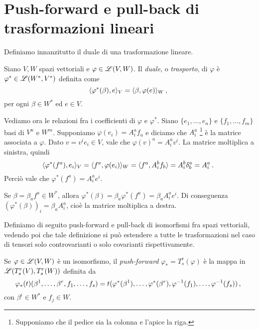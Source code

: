 \section{Push-forward e pull-back di trasformazioni lineari}

Definiamo innanzitutto il duale di una trasformazione lineare.
\begin{definition}   
	Siano $V,W$ spazi vettoriali e $\varphi \in \mathscr L(V,W)$. Il \emph{duale}, o \emph{trasporto}, di $\varphi$ è $\varphi^* \in \mathscr L(W^*,V^*)$ definita come 
	\begin{equation*}
		\Scal{\varphi^*(\beta)}{e}_V = \Scal{\beta}{\varphi(e)}_W \virgola %
	\end{equation*}
	per ogni $\beta \in W^*$ ed $e\in V$.
\end{definition}

Vediamo ora le relazioni fra i coefficienti di $\varphi$ e $\varphi^*$.
Siano $\{e_1,\ldots, e_n\}$ e $\{f_1,\ldots, f_m\}$ basi di $V^n$ e $W^m$. Supponiamo $\varphi(e_i) = A_i^af_a$ e diciamo che $A_i^a$ \footnote{Supponiamo che il pedice sia la colonna e l'apice la riga.} è la matrice associata a $\varphi$.
Dato $v = v^ie_i\in V$, vale che $\varphi(v)^a = A_i^a v^i$.
La matrice moltiplica a sinistra, quindi
\begin{equation*}
	\langle \varphi^*(f^a) , e_i \rangle_V = \langle f^a , \varphi(e_i) \rangle_W = \langle f^a , A_i^b f_b \rangle = A_i^b\delta_b^a = A_i^a\, \text{. }
\end{equation*}
Perciò vale che $\varphi^*(f^a) = A_i^a e^i$.

Se $\beta = \beta_a f^a \in W^*$, allora $\varphi^*(\beta) = \beta_a \varphi^*(f^a) = \beta_aA_i^ae^i$.
Di conseguenza $(\varphi^*(\beta))_i = \beta_aA_i^a$, cioè la matrice moltiplica a destra.


Definiamo di seguito push-forward e pull-back di isomorfismi fra spazi vettoriali, vedendo poi che tale definizione si può estendere a tutte le trasformazioni nel caso di tensori solo controvarianti o solo covarianti rispettivamente.

\begin{definition} 
	Se $\varphi \in \mathscr L(V,W)$ è un isomorfismo, il \emph{push-forward} $\varphi_* = T_s^r(\varphi)$ è la mappa in $\mathscr L(T_s^r(V), T_s^r(W))$ definita da
	\begin{equation*}
		\varphi_*(t) (\beta^1,\ldots,\beta^r,f_1,\ldots,f_s) = t(\varphi^*(\beta^1),\ldots,\varphi^*(\beta^r), \varphi^{-1}(f_1),\ldots, \varphi^{-1}(f_s)) \, \text{, }
	\end{equation*}
	con $\beta^i\in W^*$ e $f_j\in W$.
\end{definition}

